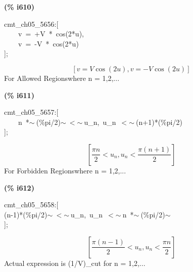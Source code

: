 \documentclass[fleqn]{article}
\begin{document}
\noindent
\begin{minipage}[t]{4.000000em}\color{red}\bfseries
(\% i610)	
\end{minipage}
\begin{minipage}[t]{\textwidth}\color{blue}
cmt\_ch05\_5656:[\\
\ \ \ \ v\ =\ +V\ *\ cos(2*u),\\
\ \ \ \ v\ =\ -V\ *\ cos(2*u)\\
];
\end{minipage}
\[\displaystyle \tag{\% o610} 
\left[ v=V \cos{\left( 2 u\right) }\operatorname{,}v=-V \cos{\left( 2 u\right) }\right] \mbox{}
\]
For Allowed Regionswhere n = 1,2,...


\noindent
\begin{minipage}[t]{4.000000em}\color{red}\bfseries
(\% i611)	
\end{minipage}
\begin{minipage}[t]{\textwidth}\color{blue}
cmt\_ch05\_5657:[\\
\ \ \ \ n\ *\ensuremath{\sim\ }(\%pi/2)\ensuremath{\sim\ }\ensuremath{<}\ensuremath{\sim\ }u\_n,\ u\_n\ \ensuremath{<}\ensuremath{\sim\ }(n+1)*(\%pi/2)\\
];
\end{minipage}
\[\displaystyle \tag{\% o611} 
\left[ \frac{\ensuremath{\pi}  n}{2}\operatorname{<  }{u_n}\operatorname{,}{u_n}\operatorname{<  }\frac{\ensuremath{\pi}  \left( n+1\right) }{2}\right] \mbox{}
\]
For Forbidden Regionswhere n = 1,2,...


\noindent
\begin{minipage}[t]{4.000000em}\color{red}\bfseries
(\% i612)	
\end{minipage}
\begin{minipage}[t]{\textwidth}\color{blue}
cmt\_ch05\_5658:[\\
(n-1)*(\%pi/2)\ensuremath{\sim\ }\ensuremath{<}\ensuremath{\sim\ }u\_n,\ u\_n\ \ensuremath{<}\ensuremath{\sim\ }n\ *\ensuremath{\sim\ }(\%pi/2)\ensuremath{\sim\ }\\
];
\end{minipage}
\[\displaystyle \tag{\% o612} 
\left[ \frac{\ensuremath{\pi}  \left( n-1\right) }{2}\operatorname{<  }{u_n}\operatorname{,}{u_n}\operatorname{<  }\frac{\ensuremath{\pi}  n}{2}\right] \mbox{}
\]
Actual expression is (1/V)\_cut for n = 1,2,...
\end{document}

